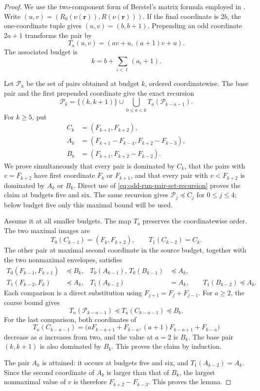 \begin{proof}
We use the two-component form of Berstel's matrix formula employed in
\cite[Sec.~2]{KocabovaMasakovaPelantova2005}.  Write
\((u,v)=(R_0(\nu(\mathbf r)),R(\nu(\mathbf r)))\).  If the final coordinate
is \(2b\), the one-coordinate tuple gives \((u,v)=(b,b+1)\).  Prepending
an odd coordinate \(2a+1\) transforms the pair by
\begin{equation}
 T_a(u,v)=(av+u,(a+1)v+u).
 \label{eq:odd-run-pair-recursion}
\end{equation}
The associated budget is
\[
 k=b+\sum_{i<\ell}(a_i+1).
\]

Let \(\mathcal P_k\) be the set of pairs obtained at budget \(k\), ordered
coordinatewise.  The base pair and the first prepended coordinate give the
exact recursion
\begin{equation}
 \mathcal P_k=\{(k,k+1)\}\cup
 \bigcup_{0\le a<k}T_a(\mathcal P_{k-a-1}).
 \label{eq:odd-run-pair-set-recursion}
\end{equation}
For \(k\ge5\), put
\[
 \begin{aligned}
 C_k&=(F_{k+1},F_{k+2}),\\
 A_k&=(F_{k+1}-F_{k-4},F_{k+2}-F_{k-3}),\\
 B_k&=(F_{k+1},F_{k+2}-F_{k-2}).
 \end{aligned}
\]
We prove simultaneously that every pair is dominated by \(C_k\), that the
pairs with \(v=F_{k+2}\) have first coordinate \(F_k\) or \(F_{k+1}\),
and that every pair with \(v<F_{k+2}\) is dominated by \(A_k\) or \(B_k\).
Direct use of
\eqref{eq:odd-run-pair-set-recursion} proves the claim at budgets five and
six.  The same recursion gives \(\mathcal P_j\preceq C_j\) for
\(0\le j\le4\); below budget five only this maximal bound will be used.

Assume it at all smaller budgets.  The map \(T_a\) preserves the
coordinatewise order.  The two maximal images are
\[
 T_0(C_{k-1})=(F_k,F_{k+2}),
 \qquad
 T_1(C_{k-2})=C_k.
\]
The other pair at maximal second coordinate in the source budget, together
with the two nonmaximal envelopes, satisfies
\begin{align*}
 T_0(F_{k-1},F_{k+1})&\preceq B_k,&
 T_0(A_{k-1}),\,T_0(B_{k-1})&\preceq A_k,\\
 T_1(F_{k-2},F_k)&\preceq A_k,&
 T_1(A_{k-2})&=A_k,\qquad
 T_1(B_{k-2})\preceq A_k.
\end{align*}
Each comparison is a direct substitution using
\(F_{j+1}=F_j+F_{j-1}\).  For \(a\ge2\), the coarse bound gives
\[
 T_a(\mathcal P_{k-a-1})
 \preceq T_a(C_{k-a-1})\preceq B_k.
\]
For the last comparison, both coordinates of
\[
 T_a(C_{k-a-1})
 =\bigl(aF_{k-a+1}+F_{k-a},
        (a+1)F_{k-a+1}+F_{k-a}\bigr)
\]
decrease as \(a\) increases from two, and the value at \(a=2\) is \(B_k\).
The base pair \((k,k+1)\) is also dominated by \(B_k\).  This proves the
claim by induction.

The pair \(A_k\) is attained: it occurs at budgets five and six, and
\(T_1(A_{k-2})=A_k\).  Since the second coordinate of \(A_k\) is larger
than that of \(B_k\), the largest nonmaximal value of \(v\) is therefore
\(F_{k+2}-F_{k-3}\).  This proves the lemma.
\end{proof}

